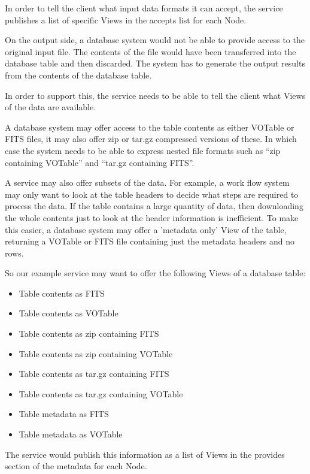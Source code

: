 \documentclass[11pt,a4paper]{ivoa}
\begin{document}
In order to tell the client what input data formats it can accept, the service publishes a list of specific Views in the accepts list for each Node.

On the output side, a database system would not be able to provide access to the original input file. The contents of the file would have been transferred into the database table and then discarded. The system has to generate the output results from the contents of the database table.

In order to support this, the service needs to be able to tell the client what Views of the data are available.

A database system may offer access to the table contents as either VOTable or FITS files, it may also offer zip or tar.gz compressed versions of these. In which case the system needs to be able to express nested file formats such as ``zip containing VOTable'' and ``tar.gz containing FITS''.

A service may also offer subsets of the data. For example, a work flow system may only want to look at the table headers to decide what steps are required to process the data. If the table contains a large quantity of data, then downloading the whole contents just to look at the header information is inefficient. To make this easier, a database system may offer a 'metadata only' View of the table, returning a VOTable or FITS file containing just the metadata headers and no rows.

So our example service may want to offer the following Views of a database table:

\begin{itemize}
    \item Table contents as FITS
    \item Table contents as VOTable
    \item Table contents as zip containing FITS
    \item Table contents as zip containing VOTable
    \item Table contents as tar.gz containing FITS
    \item Table contents as tar.gz containing VOTable
    \item Table metadata as FITS
    \item Table metadata as VOTable
\end{itemize}

The service would publish this information as a list of Views in the provides section of the metadata for each Node.
\end{document}
